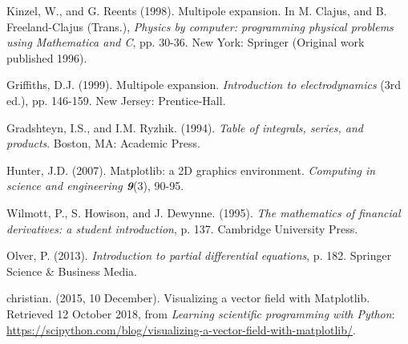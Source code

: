 \documentclass[12pt,a4paper,twoside]{article}
\begin{document}
\clearpage


\begin{thebibliography}{1}
\label{sec:Ref}

Kinzel, W., and G. Reents (1998). Multipole expansion. In M. Clajus, and B. Freeland-Clajus (Trans.), \textit{Physics by computer: programming physical problems using Mathematica and C}, pp. 30-36. New York: Springer (Original work published 1996).

Griffiths, D.J. (1999). Multipole expansion. \textit{Introduction to electrodynamics} (3rd ed.), pp. 146-159. New Jersey: Prentice-Hall.

Gradshteyn, I.S., and I.M. Ryzhik. (1994). \textit{Table of integrals, series, and products}. Boston, MA: Academic Press.

Hunter, J.D. (2007). Matplotlib: a 2D graphics environment. \textit{Computing in science and engineering \textbf{9}}(3), 90-95.

Wilmott, P., S. Howison, and J. Dewynne. (1995). \textit{The mathematics of financial derivatives: a student introduction}, p. 137. Cambridge University Press.

Olver, P. (2013). \textit{Introduction to partial differential equations}, p. 182. Springer Science \& Business Media.

christian. (2015, 10 December). Visualizing a vector field with Matplotlib. Retrieved 12 October 2018, from \textit{Learning scientific programming with Python}: \url{https://scipython.com/blog/visualizing-a-vector-field-with-matplotlib/}.

\end{thebibliography}
\end{document}
